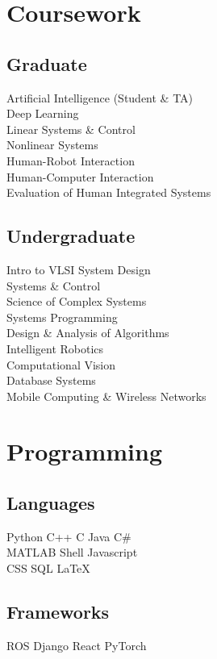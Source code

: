 \documentclass[]{deedy-resume}
\begin{document}
\begin{minipage}[t]{0.33\textwidth}

\section{Coursework}
\subsection{Graduate}
Artificial Intelligence {\scriptsize (Student \& TA)} \\
Deep Learning \\
Linear Systems \& Control \\
Nonlinear Systems \\
Human-Robot Interaction \\
Human-Computer Interaction \\
Evaluation of Human Integrated Systems \\
\sectionsep

\subsection{Undergraduate}
Intro to VLSI System Design \\
Systems \& Control \\
Science of Complex Systems \\
Systems Programming \\
Design \& Analysis of Algorithms \\
Intelligent Robotics \\
Computational Vision \\
Database Systems \\
Mobile Computing \& Wireless Networks \\


\section{Programming}
\subsection{Languages}
Python \textbullet{} C++ \textbullet{} C \textbullet{} Java \textbullet{} C\# \\
MATLAB \textbullet{} Shell \textbullet{} Javascript \\
CSS \textbullet{} SQL \textbullet{} \LaTeX \\
\sectionsep

\subsection{Frameworks}
ROS \textbullet{} Django \textbullet{} React \textbullet{} PyTorch

%
%

\end{minipage}
\end{document}
